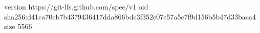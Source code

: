 version https://git-lfs.github.com/spec/v1
oid sha256:d41ca70cb7b4379436417dda866bdc3f352e07e57a5c7f9d156b5b47d33baca4
size 5566

